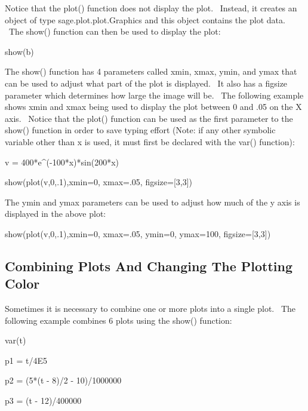 \documentclass[12pt,twoside]{book}
\begin{document}
\bigskip

Notice that the plot() function does not display the plot. \ Instead, it
creates an object of type sage.plot.plot.Graphics and this object
contains the plot data. \ The show() function can then be used to
display the plot:


\bigskip

show(b)

{\textbar}


\bigskip

The show() function has 4 parameters called xmin, xmax, ymin, and ymax
that can be used to adjust what part of the plot is displayed. \ It
also has a figsize parameter which determines how large the image will
be. \ The following example shows xmin and xmax being used to display
the plot between 0 and .05 on the X axis. \ Notice that the plot()
function can be used as the first parameter to the show() function in
order to save typing effort (Note: if any other symbolic variable other
than x is used, it must first be declared with the var() function):


\bigskip

v = 400*e\^{}({}-100*x)*sin(200*x)

show(plot(v,0,.1),xmin=0, xmax=.05, figsize=[3,3])

{\textbar}


\bigskip

The ymin and ymax parameters can be used to adjust how much of the y
axis is displayed in the above plot:


\bigskip

show(plot(v,0,.1),xmin=0, xmax=.05, ymin=0, ymax=100, figsize=[3,3])

{\textbar}


\bigskip

\subsection[Combining Plots And Changing The Plotting
Color]{Combining Plots And Changing The Plotting Color}
Sometimes it is necessary to combine one or more plots into a single
plot. \ The following example combines 6 plots using the show()
function:


\bigskip

var({\textquotesingle}t{\textquotesingle})

p1 = t/4E5

p2 = (5*(t {}- 8)/2 {}- 10)/1000000

p3 = (t {}- 12)/400000
\end{document}

